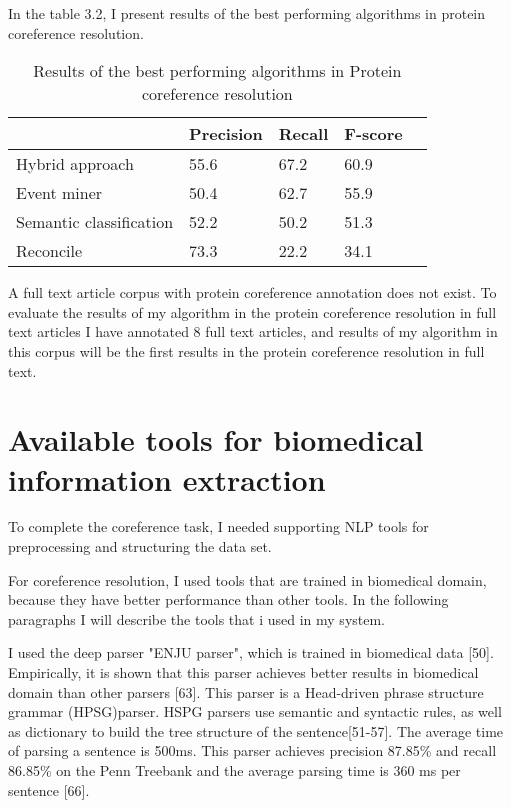  In the table 3.2, I present results of the best performing algorithms in protein coreference resolution.
\begin{table}[h]
\centering
  \begin{center}
  \centering
 	\begin{tabular}{L{4.2cm} C{2cm} C{2cm} C{2cm}  @{}m{0pt}@{}} 
 		
  		& Precision & Recall & F-score& \\ [1.1ex] 
 		\hline
 		Hybrid approach & 55.6 & 67.2 & 60.9& \\ [1.1ex] 
 		\hline
 		Event miner & 50.4 & 62.7 & 55.9& \\ [1.1ex] 
 		\hline
 		Semantic classification & 52.2 & 50.2 & 51.3& \\ [1.1ex] 
 		\hline
 		Reconcile & 73.3 & 22.2 & 34.1& \\ [1.1ex] 
 		\hline
	\end{tabular}
  \end{center} 
  \caption{Results of the best performing algorithms in Protein coreference resolution}
  \label{table3.2}
\end{table}

A full text article corpus with protein coreference annotation does not exist. To evaluate the results of my algorithm in the protein coreference resolution in full text articles I have annotated 8 full text articles, and results of my algorithm in this corpus will be the first  results in the protein coreference resolution in full text.
 
\section{Available tools for biomedical information extraction}

To complete the coreference task, I needed supporting NLP tools for preprocessing and structuring the data set.

For coreference resolution, I used tools that are trained in biomedical domain, because they have better performance than other tools. In the following paragraphs I will describe the tools that i used in my system.

I used the deep parser "ENJU parser", which is trained in biomedical data [50]. Empirically, it is shown that this parser achieves better results in biomedical domain than other parsers [63]. This parser is a Head-driven phrase structure grammar (HPSG)parser. HSPG parsers use semantic and syntactic rules, as well as dictionary to build the tree structure of the sentence[51-57]. The average time of parsing a sentence is 500ms. This parser achieves precision 87.85\% and recall 86.85\% on the Penn Treebank and the average parsing time is 360 ms per sentence [66].

